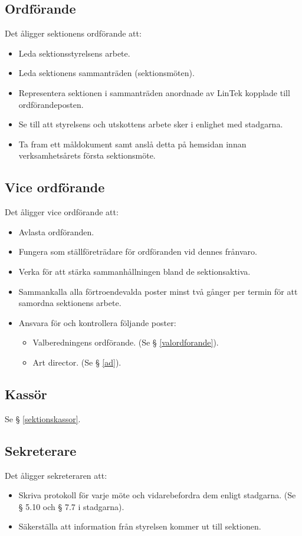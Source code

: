 \documentclass{datateknologsektionen-document}
\begin{document}
\subsection{Ordförande}
\label{ordforande}
Det åligger sektionens ordförande att:
\begin{itemize}
  \item Leda sektionsstyrelsens arbete.
  \item Leda sektionens sammanträden (sektionsmöten).
  \item Representera sektionen i sammanträden anordnade av LinTek kopplade till ordförandeposten.
  \item Se till att styrelsens och utskottens arbete sker i enlighet med stadgarna.
  \item Ta fram ett måldokument samt anslå detta på hemsidan innan verksamhetsårets första sektionsmöte.
\end{itemize}
\subsection{Vice ordförande}
\label{viceordforande}
Det åligger vice ordförande att:
\begin{itemize}
  \item Avlasta ordföranden.
  \item Fungera som ställföreträdare för ordföranden vid dennes frånvaro.
  \item Verka för att stärka sammanhållningen bland de sektionsaktiva.
  \item Sammankalla alla förtroendevalda poster minst två gånger per termin för att samordna sektionens arbete.
  \item Ansvara för och kontrollera följande poster:
  \begin{itemize}
    \item Valberedningens ordförande. (Se § \ref{valordforande}).
    \item Art director. (Se § \ref{ad}).
  \end{itemize}
\end{itemize}

\subsection{Kassör}
\label{styrelsekassor}
Se § \ref{sektionskassor}.
\subsection{Sekreterare}
\label{sekreterare}
Det åligger sekreteraren att:
\begin{itemize}
  \item Skriva protokoll för varje möte och vidarebefordra dem enligt stadgarna. (Se § 5.10 och § 7.7 i stadgarna).
  \item Säkerställa att information från styrelsen kommer ut till sektionen.
\end{itemize}
\end{document}
